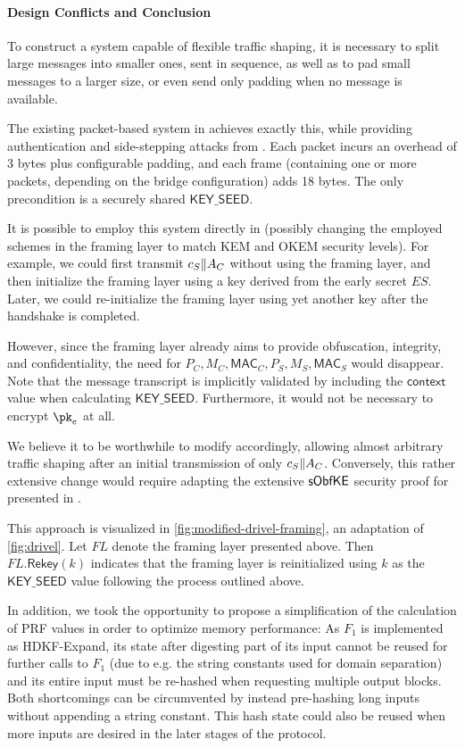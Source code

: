 \paragraph{Design Conflicts and Conclusion}

To construct a system capable of flexible traffic shaping, it is necessary to split large messages into smaller ones, sent in sequence, as well as to pad small messages to a larger size, or even send only padding when no message is available.

The existing packet-based system in \obfsfour{} achieves exactly this, while providing authentication and side-stepping attacks from \cite{SP:AlbPatWat09}. Each packet incurs an overhead of 3 bytes plus configurable padding, and each frame (containing one or more packets, depending on the bridge configuration) adds 18 bytes.
The only precondition is a securely shared $\mathsf{KEY\_SEED}$.

It is possible to employ this system directly in \drivel{} (possibly changing the employed schemes in the framing layer to match KEM and OKEM security levels).
For example, we could first transmit $c_S \| A_C$ without using the framing layer, and then initialize the framing layer using a key derived from the early secret $ES$. Later, we could re-initialize the framing layer using yet another key after the handshake is completed.

However, since the framing layer already aims to provide obfuscation, integrity, and confidentiality, the need for $P_C, M_C, \mathsf{MAC}_C, P_S, M_S, \mathsf{MAC}_S$ would disappear. Note that the message transcript is implicitly validated by including the $\mathsf{context}$ value when calculating $\mathsf{KEY\_SEED}$. Furthermore, it would not be necessary to encrypt $\pk_e$ at all.

We believe it to be worthwhile to modify \drivel{} accordingly, allowing almost arbitrary traffic shaping after an initial transmission of only $c_S \| A_C$.
Conversely, this rather extensive change would require adapting the extensive $\mathsf{sObfKE}$ security proof for \drivel{} presented in \cite{EPRINT:GRSV25}.

This approach is visualized in \cref{fig:modified-drivel-framing}, an adaptation of \cref{fig:drivel}. Let $FL$ denote the framing layer presented above. Then $FL.\mathsf{Rekey}(k)$ indicates that the framing layer is reinitialized using $k$ as the $\mathsf{KEY\_SEED}$ value following the process outlined above.

In addition, we took the opportunity to propose a simplification of the calculation of PRF values in order to optimize memory performance:
As $F_1$ is implemented as \textsf{HDKF-Expand}, its state after digesting part of its input cannot be reused for further calls to $F_1$ (due to e.g. the string constants used for domain separation) and its entire input must be re-hashed when requesting multiple output blocks.
Both shortcomings can be circumvented by instead pre-hashing long inputs without appending a string constant. This hash state could also be reused when more inputs are desired in the later stages of the protocol.

